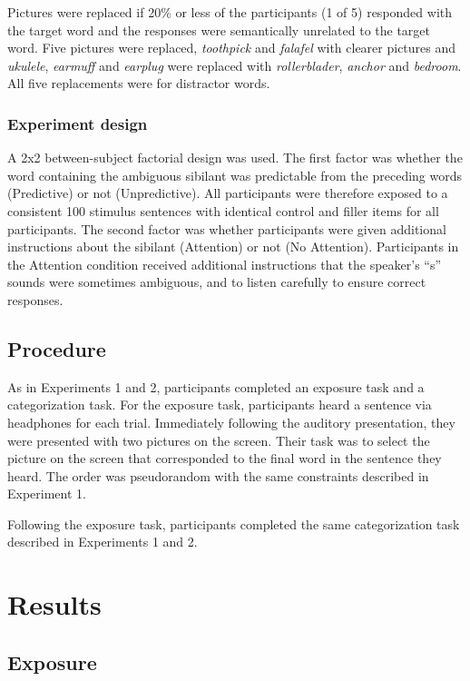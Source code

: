 Pictures were replaced if 20\% or less of the participants (1 of 5) responded with the target word and the responses were semantically unrelated to the target word. 
Five pictures were replaced, \emph{toothpick} and \emph{falafel} with clearer pictures and \emph{ukulele}, \emph{earmuff} and \emph{earplug} were replaced with \emph{rollerblader}, \emph{anchor} and \emph{bedroom}.  
All five replacements were for distractor words.

\subsubsection{Experiment design}

A 2x2 between-subject factorial design was used.
The first factor was whether the word containing the ambiguous sibilant was predictable from the preceding words (Predictive) or not (Unpredictive).
All participants were therefore exposed to a consistent 100 stimulus sentences with identical control and filler items for all participants.
The second factor was whether participants were given additional instructions about the sibilant (Attention) or not (No Attention).
Participants in the Attention condition received additional instructions that the speaker's ``s'' sounds were sometimes ambiguous, and to listen carefully to ensure correct responses.

\subsection{Procedure}

As in Experiments 1 and 2, participants completed an exposure task and a categorization task.  
For the exposure task, participants heard a sentence via headphones for each trial.  
Immediately following the auditory presentation, they were presented with two pictures on the screen.  
Their task was to select the picture on the screen that corresponded to the final word in the sentence they heard.  
The order was pseudorandom with the same constraints described in Experiment 1.

Following the exposure task, participants completed the same categorization task described in Experiments 1 and 2.

\section{Results}

\subsection{Exposure}

